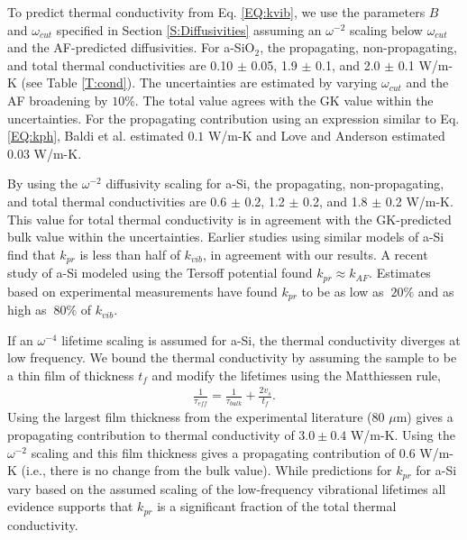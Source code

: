 \documentclass[aps,prb,onecolumn,preprint,superscriptaddress,footinbib,amsmath,amssymb,floatfix]{revtex4}
\begin{document}
To predict thermal conductivity from Eq. \eqref{EQ:kvib}, 
we use the parameters $B$ and $\omega_{cut}$ specified 
in Section \ref{S:Diffusivities} assuming an $\omega^{-2}$ 
scaling below $\omega_{cut}$ and the AF-predicted diffusivities. 
For a-SiO$_2$, the propagating, non-propagating, and total thermal 
conductivities are 0.10 $\pm$ 0.05, 1.9 $\pm$ 0.1, 
and 2.0 $\pm$ 0.1 W/m-K (see Table \ref{T:cond}). The uncertainties 
are estimated by varying $\omega_{cut}$ and the AF 
broadening by $10\%$.  
The total value agrees with the GK value within the uncertainties. 
For the propagating contribution 
using an expression similar to Eq. \eqref{EQ:kph}, 
Baldi et al. estimated\cite{baldi_thermal_2008} $0.1$ W/m-K and 
Love and Anderson\cite{love_estimate_1990} estimated 0.03 W/m-K.

By using the $\omega^{-2}$ diffusivity scaling for a-Si, 
the propagating, non-propagating, and total thermal conductivities 
are 0.6 $\pm$ 0.2, 1.2 $\pm$ 0.2, and 1.8 $\pm$ 0.2 W/m-K. 
This value for total thermal conductivity 
is in agreement with the GK-predicted bulk value within the 
uncertainties. Earlier studies using 
similar models of a-Si find 
that $k_{pr}$ is less than half of 
$k_{vib}$,\cite{feldman_thermal_1993,
feldman_numerical_1999} in agreement with our results.  
A recent study of a-Si modeled using the Tersoff potential found 
$k_{pr} \approx k_{AF}$.\cite{he_heat_2011} 
Estimates based on experimental measurements 
have found $k_{pr}$ to be as low 
as\cite{cahill_thermal_1994,feldman_numerical_1999} $~20\%$ 
and as high as $~80\%$ of $k_{vib}$.
\cite{liu_high_2009,yang_anomalously_2010}

If an $\omega^{-4}$ lifetime scaling is assumed for a-Si, 
the thermal conductivity diverges at low frequency. We bound the 
thermal conductivity by assuming the sample to be a thin film 
of thickness $t_f$ and modify the lifetimes using the Matthiessen 
rule,\cite{sellan_cross-plane_2010} 
\begin{equation}\label{EQ:LambdaMatth}
\begin{split}
\frac{1}{\tau_{eff}} = \frac{1}{\tau_{bulk}} + 
\frac{2v_s}{t_f}.
\end{split}
\end{equation}
Using the largest film thickness from the experimental 
literature ($80$ $\mu$m)\cite{liu_high_2009} 
gives a propagating contribution 
to thermal conductivity of $3.0 \pm 0.4$ W/m-K. 
Using the $\omega^{-2}$ scaling and this film thickness 
gives a propagating contribution of 0.6 W/m-K (i.e., there is 
no change from the bulk value). 
While predictions for $k_{pr}$ for a-Si  
vary based on the assumed scaling of the low-frequency 
vibrational lifetimes
\cite{feldman_thermal_1993,cahill_thermal_1994,
feldman_numerical_1999,liu_high_2009,yang_anomalously_2010,
he_heat_2011} 
all evidence supports that $k_{pr}$ is a significant fraction 
of the total thermal conductivity.
\cite{feldman_thermal_1993,cahill_thermal_1994,
feldman_numerical_1999,liu_high_2009,
yang_anomalously_2010,
he_heat_2011,regner_broadband_2013}
\end{document}
